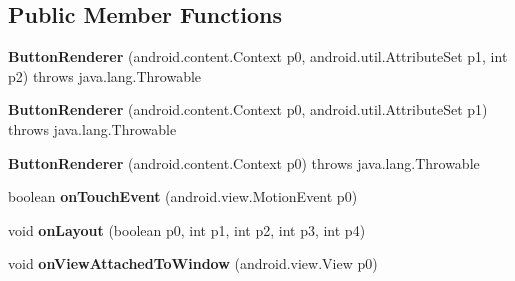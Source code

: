 \subsection*{Public Member Functions}
\begin{DoxyCompactItemize}
\item 
\mbox{\label{classmd57018357d52b54713cd814fbd5262dd1f_1_1ButtonRenderer_a49a2994aa5791809343aab825cacd93d}} 
{\bfseries Button\+Renderer} (android.\+content.\+Context p0, android.\+util.\+Attribute\+Set p1, int p2)  throws java.\+lang.\+Throwable 	
\item 
\mbox{\label{classmd57018357d52b54713cd814fbd5262dd1f_1_1ButtonRenderer_a394e9836ab253d8ba9be78efc809e8d2}} 
{\bfseries Button\+Renderer} (android.\+content.\+Context p0, android.\+util.\+Attribute\+Set p1)  throws java.\+lang.\+Throwable 	
\item 
\mbox{\label{classmd57018357d52b54713cd814fbd5262dd1f_1_1ButtonRenderer_af7305e740bebafe67f3214621b380601}} 
{\bfseries Button\+Renderer} (android.\+content.\+Context p0)  throws java.\+lang.\+Throwable 	
\item 
\mbox{\label{classmd57018357d52b54713cd814fbd5262dd1f_1_1ButtonRenderer_a8c6de4a7b4de358182be7eb07060dd03}} 
boolean {\bfseries on\+Touch\+Event} (android.\+view.\+Motion\+Event p0)
\item 
\mbox{\label{classmd57018357d52b54713cd814fbd5262dd1f_1_1ButtonRenderer_aea95208e7b65ea2e2fab71a2b027d47b}} 
void {\bfseries on\+Layout} (boolean p0, int p1, int p2, int p3, int p4)
\item 
\mbox{\label{classmd57018357d52b54713cd814fbd5262dd1f_1_1ButtonRenderer_a1251093a49d0864f526d797ee9794583}} 
void {\bfseries on\+View\+Attached\+To\+Window} (android.\+view.\+View p0)
\item 
\mbox{\label{classmd57018357d52b54713cd814fbd5262dd1f_1_1ButtonRenderer_a5ac1b7c1483240a116c3722b71146f75}} 

\end{DoxyCompactItemize}
